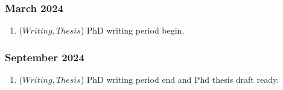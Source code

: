  \subsubsection{March 2024}
  \begin{enumerate}
    \item (\(Writing, Thesis\)) PhD writing period begin.
 \end{enumerate}

 \subsubsection{September 2024}
  \begin{enumerate}
    \item (\(Writing, Thesis\)) PhD writing period end and Phd thesis draft ready.
 \end{enumerate}











